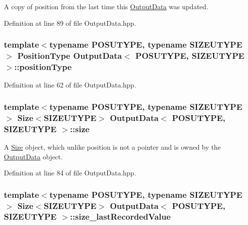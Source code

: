A copy of position from the last time this \hyperlink{struct_output_data}{Output\-Data} was updated. 



Definition at line 89 of file Output\-Data.\-hpp.

\hypertarget{struct_output_data_a344be69157cfd43c9ace4158b0e58b6b}{
\subsubsection[{position\-Type}]{\setlength{\rightskip}{0pt plus 5cm}template$<$typename P\-O\-S\-U\-T\-Y\-P\-E, typename S\-I\-Z\-E\-U\-T\-Y\-P\-E$>$ {\bf Position\-Type} {\bf Output\-Data}$<$ P\-O\-S\-U\-T\-Y\-P\-E, S\-I\-Z\-E\-U\-T\-Y\-P\-E $>$\-::position\-Type\hspace{0.3cm}{\ttfamily [protected]}}}\label{struct_output_data_a344be69157cfd43c9ace4158b0e58b6b}


Definition at line 62 of file Output\-Data.\-hpp.

\hypertarget{struct_output_data_aa0cfd47e41dd6e32a43b10cecdcbeb2b}{
\subsubsection[{size}]{\setlength{\rightskip}{0pt plus 5cm}template$<$typename P\-O\-S\-U\-T\-Y\-P\-E, typename S\-I\-Z\-E\-U\-T\-Y\-P\-E$>$ {\bf Size}$<$S\-I\-Z\-E\-U\-T\-Y\-P\-E$>$ {\bf Output\-Data}$<$ P\-O\-S\-U\-T\-Y\-P\-E, S\-I\-Z\-E\-U\-T\-Y\-P\-E $>$\-::size\hspace{0.3cm}{\ttfamily [protected]}}}\label{struct_output_data_aa0cfd47e41dd6e32a43b10cecdcbeb2b}


A \hyperlink{struct_size}{Size} object, which unlike position is not a pointer and is owned by the \hyperlink{struct_output_data}{Output\-Data} object. 



Definition at line 84 of file Output\-Data.\-hpp.

\hypertarget{struct_output_data_a3007edb5d6739619f9e6b3f8ae8e5be1}{
\subsubsection[{size\-\_\-last\-Recorded\-Value}]{\setlength{\rightskip}{0pt plus 5cm}template$<$typename P\-O\-S\-U\-T\-Y\-P\-E, typename S\-I\-Z\-E\-U\-T\-Y\-P\-E$>$ {\bf Size}$<$S\-I\-Z\-E\-U\-T\-Y\-P\-E$>$ {\bf Output\-Data}$<$ P\-O\-S\-U\-T\-Y\-P\-E, S\-I\-Z\-E\-U\-T\-Y\-P\-E $>$\-::size\-\_\-last\-Recorded\-Value\hspace{0.3cm}{\ttfamily [protected]}}}\label{struct_output_data_a3007edb5d6739619f9e6b3f8ae8e5be1}



